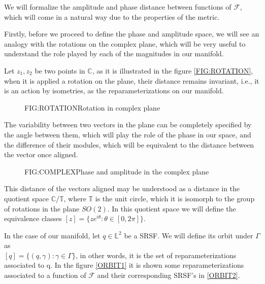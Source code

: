 
We will formalize the amplitude and phase distance between functions of
$\mathcal{F}$, which will come in a natural way due to the properties of the
metric.

Firstly, before we proceed to define the phase and amplitude space, we will see
an analogy with the rotations on the complex plane, which will be very useful to
understand the role played by each of the magnitudes in our manifold.

Let  $z_1, z_2$ be two points in $\mathbb{C}$, as it is illustrated in the
figure \ref{FIG:ROTATION}, when it is applied a rotation on the plane, their
distance remains invariant, i.e., it is an action by isometries, as the
reparameterizations on our manifold.


\begin{figure}[Rotation in complex plane]{FIG:ROTATION}{Rotation in complex plane}

\end{figure}

The variability between two vectors in the plane can be completely specified by
the angle between them, which will play the role of the phase in our space, and
the difference of their modules, which will be equivalent to the distance
between the vector once aligned.

\begin{figure}[Phase and amplitude in the complex plane]{FIG:COMPLEX}{Phase and amplitude in the complex plane}

 \quad
{}

\end{figure}


This distance of the vectors aligned may be understood as a distance in the
quotient space $\mathbb{C} / \mathbb{T}$, where $\mathbb{T}$ is the unit circle,
which it is isomorph to the group of rotations in the plane $SO(2)$. In this
quotient space we will define the equivalence classes
$[z] = \{z e^{i \theta} : \theta \in [0, 2\pi]\}$.

In the case of our manifold, let $q \in \mathbb{L}^2$ be a SRSF. We will define
its orbit under $\Gamma$ as \\$[q] = \{(q, \gamma) : \gamma \in \Gamma \}$, in
other words, it is the set of reparameterizations associated to q. In the
figure \ref{ORBIT1} it is shown some reparameterizations associated  to a function
of $\mathscr{F}$ and their corresponding SRSF's in \ref{ORBIT2}.


